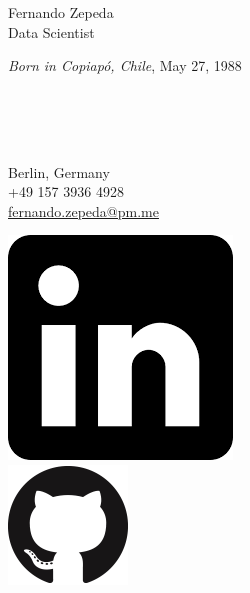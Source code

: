 \documentclass[a4paper, 12]{scrartcl}
\begin{document}
	
	\pagestyle{empty} 
	
	\begin{minipage}{0.75\textwidth}
		\begin{flushleft}
			\Large{Fernando Zepeda}\\
			\large{Data Scientist}\\[-5pt]
		\end{flushleft}
		\textcolor{newgray}{\textit{Born in Copiapó, Chile}, May 27, 1988}
		\begin{flushleft}
			\begin{minipage}{1.0\textwidth}
				\begin{flushleft}
					\begin{minipage}{0.05\textwidth}
						\faHome \\
						\faPhone \\
						\Letter \\
					\end{minipage}	
					\begin{minipage}{0.48\textwidth}
						Berlin, Germany \\
						+49 157 3936 4928 \\
						\href{mailto:fernando.zepeda@protonmail.com}{fernando.zepeda@pm.me}\\
					\end{minipage}
					\begin{minipage}{0.05\textwidth}
					    \includegraphics[width=0.4\linewidth]{images/linkedin.png}\\
					     \includegraphics[width=0.4\linewidth]{images/githublogo.png}\\

\end{minipage}
\end{flushleft}
\end{minipage}
\end{flushleft}
\end{minipage}
\end{document}
